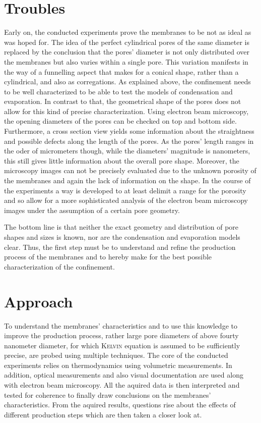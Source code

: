 \documentclass[../thesis.tex]{subfiles}
\begin{document}
    \section{Troubles}
    \label{sec:troubles}

      Early on, the conducted experiments prove the membranes to be not as ideal as was hoped for. The idea of the perfect cylindrical pores of the same diameter is replaced by the conclusion that the pores' diameter is not only distributed over the membranes but also varies within a single pore. This variation manifests in the way of a funnelling aspect that makes for a conical shape, rather than a cylindrical, and also as corregations. As explained above, the confinement needs to be well characterized to be able to test the models of condensation and evaporation. In contrast to that, the geometrical shape of the pores does not allow for this kind of precise characterization. Using electron beam microscopy, the opening diameters of the pores can be checked on top and bottom side. Furthermore, a cross section view yields some information about the straightness and possible defects along the length of the pores. As the pores' length ranges in the oder of micrometers though, while the diameters' magnitude is nanometers, this still gives little information about the overall pore shape. Moreover, the microscopy images can not be precisely evaluated due to the unknown porosity of the membranes and again the lack of information on the shape. In the course of the experiments a way is developed to at least delimit a range for the porosity and so allow for a more sophisticated analysis of the electron beam microscopy images under the assumption of a certain pore geometry.

      The bottom line is that neither the exact geometry and distribution of pore shapes and sizes is known, nor are the condensation and evaporation models clear. Thus, the first step must be to understand and refine the production process of the membranes and to hereby make for the best possible characterization of the confinement.


    \section{Approach}
    \label{sec:approach}

      To understand the membranes' characteristics and to use this knowledge to improve the production process, rather large pore diameters of above fourty nanometer diameter, for which \textsc{Kelvin} equation is assumed to be sufficiently precise, are probed using multiple techniques. The core of the conducted experiments relies on thermodynamics using volumetric measurements. In addition, optical measurements and also visual documentation are used along with electron beam microscopy. All the aquired data is then interpreted and tested for coherence to finally draw conclusions on the membranes' characteristics. From the aquired results, questions rise about the effects of different production steps which are then taken a closer look at.
\end{document}
